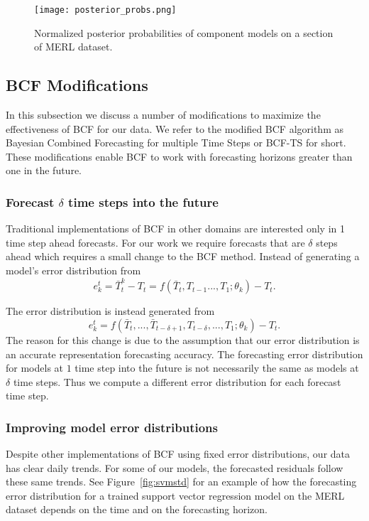 \begin{figure}
\centering
\texttt{[image: posterior\_probs.png]}
\caption{Normalized posterior probabilities of component models on a section of MERL dataset.}
\label{fig:probsmerl}
\end{figure}

\subsection{BCF Modifications}
In this subsection we discuss a number of modifications to maximize the effectiveness of BCF for our data.  We refer to the modified BCF algorithm as Bayesian Combined Forecasting for multiple Time Steps or BCF-TS for short.  These modifications  enable BCF to work with forecasting horizons greater than one in the future.

\subsubsection{Forecast $\delta$ time steps into the future}
Traditional implementations of BCF in other domains \cite{Petridis2001, Zheng2006} are interested only in 1 time step ahead forecasts.  For our work we require forecasts that are $\delta$ steps ahead which requires a small change to the BCF method.  Instead of generating a model's error distribution from 
\begin{equation}
e^{t}_{k} = \bar{T}_{t}^{k} - T_{t} = f(\bar{T}_{t},T_{t - 1} ..., T_{1}; \theta_{k}) - T_{t}.
\end{equation}

The error distribution is instead generated from 
\begin{equation}
e^{t}_{k} = f(\bar{T}_{t}, ..., \bar{T}_{t - \delta + 1}, T_{t - \delta}, ..., T_{1};\theta_{k}) - T_{t}.
\end{equation}
The reason for this change is due to the assumption that our error distribution is an accurate representation forecasting accuracy.  
The forecasting error distribution for models at $1$ time step into the future is not necessarily the same as models at $\delta$ time steps.  Thus we compute a different error distribution for each forecast time step.


\subsubsection{Improving model error distributions}
Despite other implementations of BCF using fixed error distributions, our data has clear daily trends.  For some of our models, the forecasted residuals follow these same trends.  See Figure~\ref{fig:svmstd} for an example of how the forecasting error distribution for a trained support vector regression model on the MERL dataset depends on the time and on the forecasting horizon.


